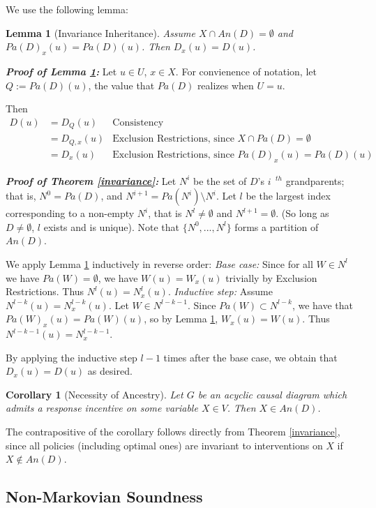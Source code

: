 \documentclass[letterpaper,10pt]{article}
\newtheorem{corollary}{Corollary}
\newtheorem{lemma}[theorem]{Lemma}
\begin{document}
We use the following lemma:
\begin{lemma}[Invariance Inheritance]\label{inheritance}
Assume $X\cap An(D)=\emptyset$ and $Pa(D)_x(u) = Pa(D)(u)$. Then $D_x(u)=D(u)$.
\end{lemma}

\textbf{\emph{Proof of Lemma \ref{inheritance}:}}
Let $u\in U$, $x\in X$. For convienence of notation, let $Q:=Pa(D)(u)$, the value that $Pa(D)$ realizes when $U=u$.

Then
\begin{align*}
D(u)&=D_Q(u) &\text{Consistency} \\
&=D_{Q,x}(u) &\text{Exclusion Restrictions, since }X\cap Pa(D)=\emptyset \\
&= D_x(u) &\text{Exclusion Restrictions, since }Pa(D)_x(u) = Pa(D)(u)
\end{align*}

\textbf{\emph{Proof of Theorem \ref{invariance}:}}
Let $N^i$ be the set of $D$'s $i^{\text{ }th}$ grandparents; that is, $N^0=Pa(D)$, and $N^{i+1}=Pa(N^i)\setminus N^i$. Let $l$ be the largest index corresponding to a non-empty $N^i$, that is $N^l\neq \emptyset$ and $N^{l+1}=\emptyset$. (So long as $D\neq\emptyset$, $l$ exists and is unique). Note that $\{N^0,...,N^l\}$ forms a partition of $An(D)$.

We apply Lemma \ref{inheritance} inductively in reverse order: \emph{Base case:} Since for all $W\in N^l$ we have $Pa(W)=\emptyset$, we have $W(u)=W_x(u)$ trivially by Exclusion Restrictions. Thus $N^l(u)=N_x^l(u)$. \emph{Inductive step:} Assume $N^{l-k}(u)=N_x^{l-k}(u)$. Let $W\in N^{l-k-1}$. Since $Pa(W)\subset N^{l-k}$, we have that $Pa(W)_x(u)=Pa(W)(u)$, so by Lemma \ref{inheritance}, $W_x(u)=W(u)$. Thus $N^{l-k-1}(u)=N_x^{l-k-1}$.

By applying the inductive step $l-1$ times after the base case, we obtain that $D_x(u)=D(u)$ as desired.

\begin{corollary}[Necessity of Ancestry]\label{ancestry}
Let $G$ be an acyclic causal diagram which admits a response incentive on some variable $X\in V$. Then $X\in An(D)$.
\end{corollary}

The contrapositive of the corollary follows directly from Theorem \ref{invariance}, since all policies (including optimal ones) are invariant to interventions on $X$ if $X\notin An(D)$.

\subsection{Non-Markovian Soundness}
\end{document}
